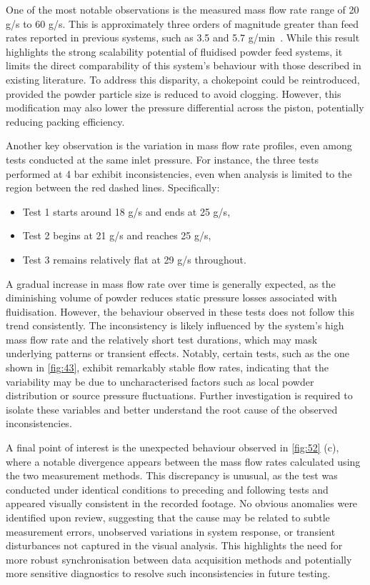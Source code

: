 One of the most notable observations is the measured mass flow rate range of 20 g/s to 60 g/s. This is approximately three orders of magnitude greater than feed rates reported in previous systems, such as 3.5 and 5.7 g/min~\cite{BHATTIPROLU20181}. While this result highlights the strong scalability potential of fluidised powder feed systems, it limits the direct comparability of this system's behaviour with those described in existing literature. To address this disparity, a chokepoint could be reintroduced, provided the powder particle size is reduced to avoid clogging. However, this modification may also lower the pressure differential across the piston, potentially reducing packing efficiency.

Another key observation is the variation in mass flow rate profiles, even among tests conducted at the same inlet pressure. For instance, the three tests performed at 4 bar exhibit inconsistencies, even when analysis is limited to the region between the red dashed lines. Specifically:
\begin{itemize}
    \item Test 1 starts around 18 g/s and ends at 25 g/s,
    \item Test 2 begins at 21 g/s and reaches 25 g/s,
    \item Test 3 remains relatively flat at 29 g/s throughout.
\end{itemize}
A gradual increase in mass flow rate over time is generally expected, as the diminishing volume of powder reduces static pressure losses associated with fluidisation. However, the behaviour observed in these tests does not follow this trend consistently. The inconsistency is likely influenced by the system's high mass flow rate and the relatively short test durations, which may mask underlying patterns or transient effects. Notably, certain tests, such as the one shown in \autoref{fig:43}, exhibit remarkably stable flow rates, indicating that the variability may be due to uncharacterised factors such as local powder distribution or source pressure fluctuations. Further investigation is required to isolate these variables and better understand the root cause of the observed inconsistencies.

A final point of interest is the unexpected behaviour observed in \autoref{fig:52} (c), where a notable divergence appears between the mass flow rates calculated using the two measurement methods. This discrepancy is unusual, as the test was conducted under identical conditions to preceding and following tests and appeared visually consistent in the recorded footage. No obvious anomalies were identified upon review, suggesting that the cause may be related to subtle measurement errors, unobserved variations in system response, or transient disturbances not captured in the visual analysis. This highlights the need for more robust synchronisation between data acquisition methods and potentially more sensitive diagnostics to resolve such inconsistencies in future testing.

